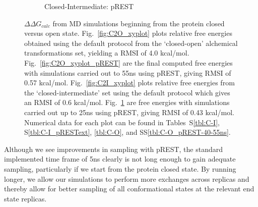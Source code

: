 \begin{figure}[H]
\begin{subfigure}{.5\textwidth}
   \caption{Closed-Intermediate: pREST}
   \label{fig:C2I_xyplot_pREST}
\end{subfigure}\hfill
\caption{$\Delta\Delta G_{calc}$ from MD simulations beginning from the protein closed versus open state.
Fig.~\ref{fig:C2O_xyplot} plots relative free energies obtained using the default protocol from the `closed-open' alchemical transformations set, yielding a RMSI of 4.0 kcal/mol.
Fig.~\ref{fig:C2O_xyplot_pREST} are the final computed free energies with simulations carried out to 55ns using pREST, giving RMSI of 0.57 kcal/mol.
Fig.~\ref{fig:C2I_xyplot} plots relative free energies from the `closed-intermediate' set using the default protocol which gives an RMSI of 0.6 kcal/mol.
Fig.~\ref{fig:C2I_xyplot_pREST} are free energies with simulations carried out up to 25ns using pREST, giving RMSI of 0.43 kcal/mol.
Numerical data for each plot can be found in Tables~S\ref{tbl:C-I}, S\ref{tbl:C-I_pRESText}, \ref{tbl:C-O}, and SS\ref{tbl:C-O_pREST-40-55ns}.
}
\label{fig:conf-xyplots}
\end{figure}

Although we see improvements in sampling with pREST, the standard implemented time frame of 5ns clearly is not long enough to gain adequate sampling, particularly if we start from the protein closed state.
By running longer, we allow our simulations to perform more exchanges across replicas and thereby allow for better sampling of all conformational states at the relevant end state replicas.

